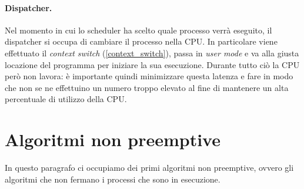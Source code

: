 \paragraph{Dispatcher.}
Nel momento in cui lo scheduler ha scelto quale processo verrà eseguito, il dispatcher si occupa di cambiare il processo nella CPU. In particolare viene effettuato il \textit{context switch} (\ref{context_switch}), passa in \textit{user mode} e va alla giusta locazione del programma per iniziare la sua esecuzione. Durante tutto ciò la CPU però non lavora: è importante quindi minimizzare questa latenza e fare in modo che non se ne effettuino un numero troppo elevato al fine di mantenere un alta percentuale di utilizzo della CPU.
% 
\section{Algoritmi non preemptive}
In questo paragrafo ci occupiamo dei primi algoritmi non preemptive, ovvero gli algoritmi che non fermano i processi che sono in esecuzione. 

